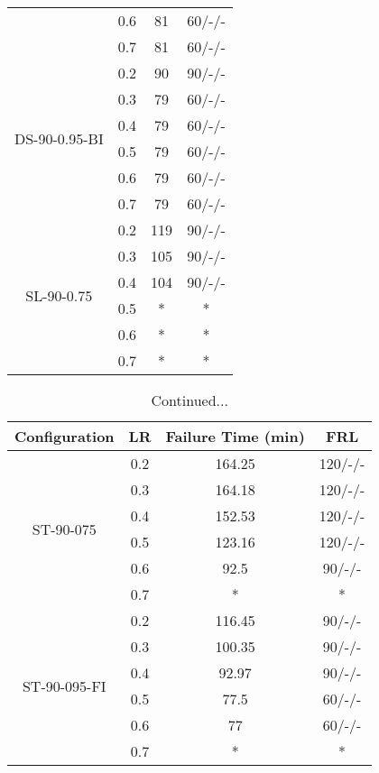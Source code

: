\begin{table}[!htbp]
\begin{tabular}{cccc}
			& 0.6   & 81 & 60/-/- \\
			& 0.7   & 81 & 60/-/- \\
	  \midrule
	  \multirow{6}[2]{*}{DS-90-0.95-BI} & 0.2   & 90 & 90/-/- \\
			& 0.3   & 79 & 60/-/- \\
			& 0.4   & 79 & 60/-/- \\
			& 0.5   & 79 & 60/-/- \\
			& 0.6   & 79 & 60/-/- \\
			& 0.7   & 79 & 60/-/- \\
	  \midrule
	  \multirow{6}[2]{*}{SL-90-0.75} & 0.2   & 119 & 90/-/- \\
			& 0.3   & 105 & 90/-/- \\
			& 0.4   & 104 & 90/-/- \\
			& 0.5   & *     & * \\
			& 0.6   & *     & * \\
			& 0.7   & *     & * \\
	  \bottomrule
	\end{tabular}%
  \label{tab:frl-parametric-experiment-a}%
\end{table}%
\begin{table}[htbp]
	\ContinuedFloat
	\centering
	\caption{Continued...}
	  \begin{tabular}{cccc}
	  \toprule
	  Configuration & LR    & Failure Time (min) & FRL \\
	  \midrule
	  \multirow{6}[2]{*}{ST-90-075} & 0.2   & 164.25 & 120/-/- \\
			& 0.3   & 164.18 & 120/-/- \\
			& 0.4   & 152.53 & 120/-/- \\
			& 0.5   & 123.16 & 120/-/- \\
			& 0.6   & 92.5  & 90/-/- \\
			& 0.7   & *     & * \\
	  \midrule
	  \multirow{6}[2]{*}{ST-90-095-FI} & 0.2   & 116.45 & 90/-/- \\
			& 0.3   & 100.35 & 90/-/- \\
			& 0.4   & 92.97 & 90/-/- \\
			& 0.5   & 77.5  & 60/-/- \\
			& 0.6   & 77    & 60/-/- \\
			& 0.7   & *     & * \\
	  \bottomrule
	  \end{tabular}%
	\label{tab:frl-parametric-experiment}%
  \end{table}%
  
